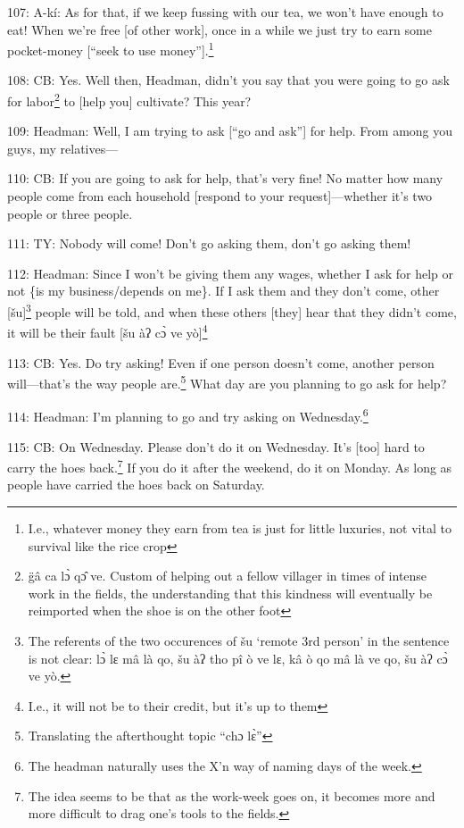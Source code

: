 107: A-kí: As for that, if we keep fussing with our tea, we won't have enough
to eat!  When we're free [of other work], once in a while we just try to earn some
pocket-money [``seek to use money''].\footnote{I.e., whatever money they earn from tea is just for little luxuries, not vital to survival like the rice crop}

108: CB: Yes. Well then, Headman, didn't you say that you were going to go ask
for labor\footnote{g̈â ca lɔ̀ qɔ̂ ve.  Custom of helping out a fellow villager in times of intense work in the fields, the understanding that this kindness will eventually be reimported when the shoe is on the other foot} to [help you] cultivate?  This year?

109: Headman: Well, I am trying to ask [``go and ask''] for help.  From among you
guys, my relatives---

110: CB: If you are going to ask for help, that's very fine!  No matter how many
people come from each household [respond to your request]---whether it's two people
or three people.

111: TY: Nobody will come!  Don't go asking them, don't go asking them!

112: Headman: Since I won't be giving them any wages, whether I ask for help or
not \{is my business/depends on me\}.  If I ask them and they don't come, other
[šu]\footnote{The referents of the two occurences of šu `remote 3rd person' in the sentence is not clear: lɔ̀ lɛ mâ là qo, šu àʔ tho pî ò ve lɛ, kâ ò qo mâ là ve qo, šu àʔ cɔ̀ ve yò.} people will be told, and when these others [they] hear that they didn't
come, it will be their fault [šu àʔ cɔ̀ ve yò]\footnote{I.e., it will not be to their credit, but it's up to them}

113: CB: Yes.  Do try asking! Even if one person doesn't come, another person will---that's
the way people are.\footnote{Translating the afterthought topic ``chɔ lɛ̀''}  What day are you planning to go ask for help?

114: Headman: I'm planning to go and try asking on Wednesday.\footnote{The headman naturally uses the X'n way of naming days of the week.}

115: CB: On Wednesday.  Please don't do it on Wednesday.  It's [too] hard to carry
the hoes back.\footnote{The idea seems to be that as the work-week goes on, it becomes more and more difficult to drag one's tools to the fields.}  If you do it after the weekend, do it on Monday.  As long as
people have carried the hoes back on Saturday.

